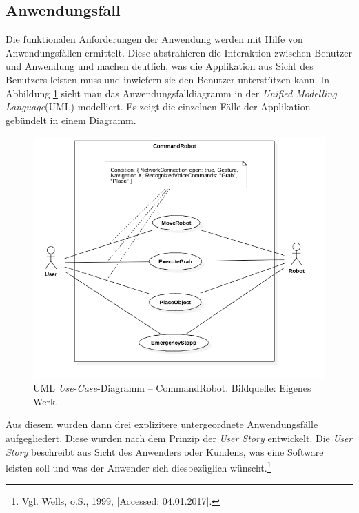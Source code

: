 \subsection{Anwendungsfall}\label{ssec:usecase}
Die funktionalen Anforderungen der Anwendung werden mit Hilfe von Anwendungsfällen ermittelt. Diese abstrahieren die Interaktion zwischen Benutzer und Anwendung und machen deutlich, was die Applikation aus Sicht des Benutzers leisten muss und inwiefern sie den Benutzer unterstützen kann. In Abbildung \ref{fig:useCaseDiagram} sieht man das Anwendungsfalldiagramm in der \textit{Unified Modelling Language}(UML) modelliert. Es zeigt die einzelnen Fälle der Applikation gebündelt in einem Diagramm. 
\begin{figure}[H]
	\centering
	\includegraphics[width=1.0\textwidth]{figuren/UseCaseDiagram}
	\caption{UML \textit{Use-Case}-Diagramm -- CommandRobot. Bildquelle: Eigenes Werk.}
	\label{fig:useCaseDiagram}
\end{figure}
Aus diesem wurden dann drei explizitere untergeordnete Anwendungsfälle aufgegliedert. Diese wurden nach dem Prinzip der \textit{User Story} entwickelt. Die \textit{User Story} beschreibt aus Sicht des Anwenders oder Kundens, was eine Software leisten soll und was der Anwender sich diesbezüglich wünscht.\footnote{ Vgl. Wells, o.S., 1999, [Accessed: 04.01.2017].}

